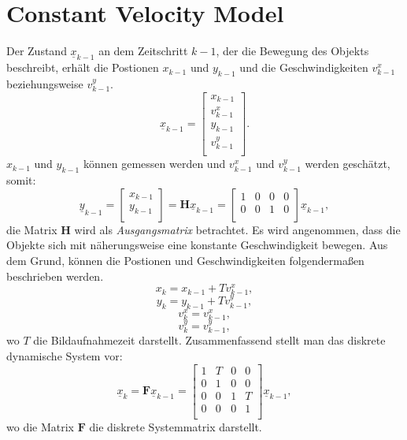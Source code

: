\documentclass[10pt,a4paper]{article}
\begin{document}
\section{Constant Velocity Model}
Der Zustand  $\underline{x}_{k-1}$ an dem Zeitschritt $k-1$, der die Bewegung des Objekts beschreibt, erhält die Postionen $x_{k-1}$ und $y_{k-1}$ und die Geschwindigkeiten $v^x_{k-1}$ beziehungsweise $v^y_{k-1}$.
\begin{equation}
\underline{x}_{k-1} = \begin{bmatrix}
x_{k-1} \\
v^x_{k-1}\\
y_{k-1}\\
v^y_{k-1}\\
\end{bmatrix}.
\end{equation}
$x_{k-1}$ und $y_{k-1}$ können gemessen werden und $v^x_{k-1}$ und $v^y_{k-1}$ werden geschätzt, somit:
\begin{equation}
\underline{y}_{k-1} = \begin{bmatrix}
x_{k-1} \\
y_{k-1}\\
\end{bmatrix} =\textbf{H}\underline{x}_{k-1} =
\begin{bmatrix}
1 & 0 &0 &0 \\
0 & 0 &1 &0\\
\end{bmatrix}\underline{x}_{k-1},
\end{equation}
die Matrix $\textbf{H}$ wird als \textit{Ausgangsmatrix} betrachtet. Es wird angenommen, dass die Objekte sich mit näherungsweise eine konstante Geschwindigkeit bewegen. Aus dem Grund, können die Postionen und Geschwindigkeiten folgendermaßen beschrieben werden.
\begin{equation}
x_{k} = x_{k-1} + Tv^x_{k-1},
\end{equation}
\begin{equation*}
y_{k} = y_{k-1} + Tv^y_{k-1},
\end{equation*}
\begin{equation*}
v^x_{k} = v^x_{k-1},
\end{equation*}
\begin{equation*}
v^y_{k} = v^y_{k-1},
\end{equation*}
wo $T$ die Bildaufnahmezeit darstellt. Zusammenfassend stellt man das diskrete dynamische System vor:
\begin{equation}
\underline{x}_{k} = \textbf{F}\underline{x}_{k-1} = 
\begin{bmatrix}
1 & T &0 &0 \\
0 & 1 &0 &0 \\
0 & 0 &1 &T\\
0 & 0 &0 &1 \\
\end{bmatrix}\underline{x}_{k-1},
\end{equation}
wo die Matrix $\textbf{F}$ die diskrete Systemmatrix darstellt.
\end{document}
